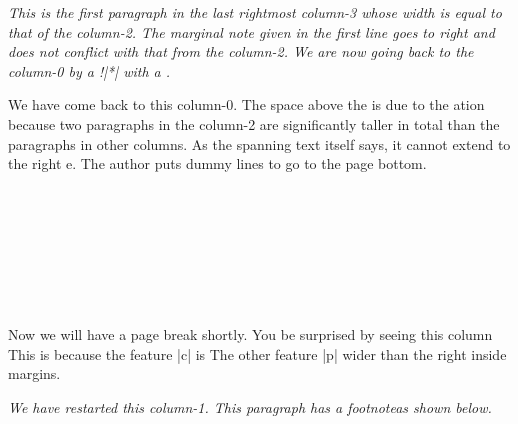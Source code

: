 \begin{paracol}[2]
\switchcolumn
\begingroup\sl
This is the first paragraph
in the last rightmost column-3 whose width is equal to that of the column-2.
The marginal note given in the first line goes to right and does not
conflict with that from the column-2.  We are now going back to the
column-0 by a {\rm\!\switchcolumn!|*|} with a \mctext.
\endgroup


We have come back to this column-0.  The space above the \mctext{} is due
to the \sync{}ation because two paragraphs in the column-2 are
significantly taller in total than the paragraphs in other columns.  As
the spanning text itself says, it cannot extend to the right \parapag{}e.
The author puts dummy lines to go to the page bottom.\\
\Dotfill\\ \Dotfill\\ \Dotfill\\ \Dotfill\\ \Dotfill\\ \Dotfill\\
\Dotfill\\ \Dotfill\par

Now we will have a page break shortly.  You  be surprised
by seeing this column   This is because the feature |c| is   The other feature |p|  wider than the right inside margins.
\label{page:ppts-npaired2}

\switchcolumn
\begingroup\it
We have restarted this column-1.  This paragraph has a
footnote\footnotemark*[-1] as shown below.\\
\Dotfill\\ \Dotfill\\ \Dotfill\\ \Dotfill\\ \Dotfill\\ \Dotfill\\
\Dotfill\\ \Dotfill\\ \Dotfill\\ \Dotfill\\ \Dotfill\par


\end{paracol}
